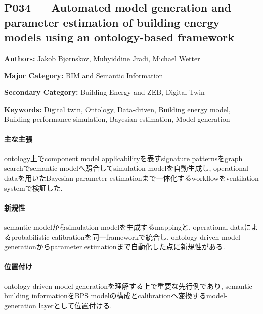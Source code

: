 \subsection{P034 --- Automated model generation and parameter estimation of building energy models using an ontology-based framework}
\label{paper:P034}
\textbf{Authors:} Jakob Bjørnskov, Muhyiddine Jradi, Michael Wetter\par
\textbf{Major Category:} BIM and Semantic Information\par
\textbf{Secondary Category:} Building Energy and ZEB, Digital Twin\par
\textbf{Keywords:} Digital twin, Ontology, Data-driven, Building energy model, Building performance simulation, Bayesian estimation, Model generation\par
\paragraph{主な主張}
ontology上でcomponent model applicabilityを表すsignature patternsをgraph searchでsemantic modelへ照合してsimulation modelを自動生成し, operational dataを用いたBayesian parameter estimationまで一体化するworkflowをventilation systemで検証した. \cite{Bjornskov:2025OntologyModelGeneration}
\paragraph{新規性}
semantic modelからsimulation modelを生成するmappingと, operational dataによるprobabilistic calibrationを同一frameworkで統合し, ontology-driven model generationからparameter estimationまで自動化した点に新規性がある.
\paragraph{位置付け}
ontology-driven model generationを理解する上で重要な先行例であり, semantic building informationをBPS modelの構成とcalibrationへ変換するmodel-generation layerとして位置付ける.
